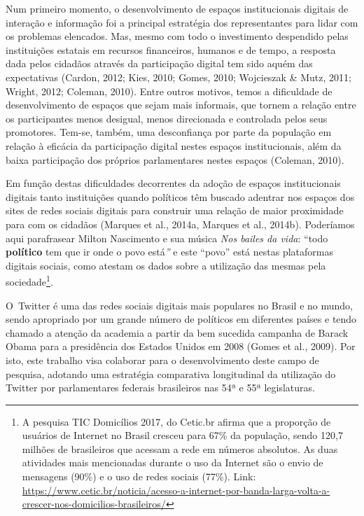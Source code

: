 Num primeiro momento, o desenvolvimento de espaços institucionais
digitais de interação e informação foi a principal estratégia dos
representantes para lidar com os problemas elencados. Mas, mesmo com
todo o investimento despendido pelas instituições estatais em recursos
financeiros, humanos e de tempo, a resposta dada pelos cidadãos através
da participação digital tem sido aquém das expectativas (Cardon, 2012;
Kies, 2010; Gomes, 2010; Wojcieszak \& Mutz, 2011; Wright, 2012;
Coleman, 2010). Entre outros motivos, temos a dificuldade de
desenvolvimento de espaços que sejam mais informais, que tornem a
relação entre os participantes menos desigual, menos direcionada e
controlada pelos seus promotores. Tem-se, também, uma desconfiança por
parte da população em relação à eficácia da participação digital nestes
espaços institucionais, além da baixa participação dos próprios
parlamentares nestes espaços (Coleman, 2010).

Em função destas dificuldades decorrentes da adoção de espaços
institucionais digitais tanto instituições quando políticos têm buscado
adentrar nos espaços dos sites de redes sociais digitais para construir
uma relação de maior proximidade para com os cidadãos (Marques et al.,
2014a, Marques et al., 2014b). Poderíamos aqui parafrasear Milton
Nascimento e sua música \emph{Nos bailes da vida}: ``todo
\textbf{político} tem que ir onde o povo está\emph{''} e este ``povo''
está nestas plataformas digitais sociais, como atestam os dados sobre a
utilização das mesmas pela sociedade\footnote{A pesquisa TIC Domicílios
  2017, do Cetic.br afirma que a proporção de usuários de Internet no
  Brasil cresceu para 67\% da população, sendo 120,7 milhões de
  brasileiros que acessam a rede em números absolutos. As duas
  atividades mais mencionadas durante o uso da Internet são o envio de
  mensagens (90\%) e o uso de redes sociais (77\%). Link:
  \url{https://www.cetic.br/noticia/acesso-a-internet-por-banda-larga-volta-a-crescer-nos-domicilios-brasileiros/}}.

O~Twitter é uma das redes sociais digitais mais populares no Brasil e no
mundo, sendo apropriado por um grande número de políticos em diferentes
países e tendo chamado a atenção da academia a partir da bem sucedida
campanha de Barack Obama para a presidência dos Estados Unidos em 2008
(Gomes et al., 2009). Por isto, este trabalho visa colaborar para o
desenvolvimento deste campo de pesquisa, adotando uma estratégia
comparativa longitudinal da utilização do Twitter por parlamentares
federais brasileiros nas 54ª e 55ª legislaturas.

